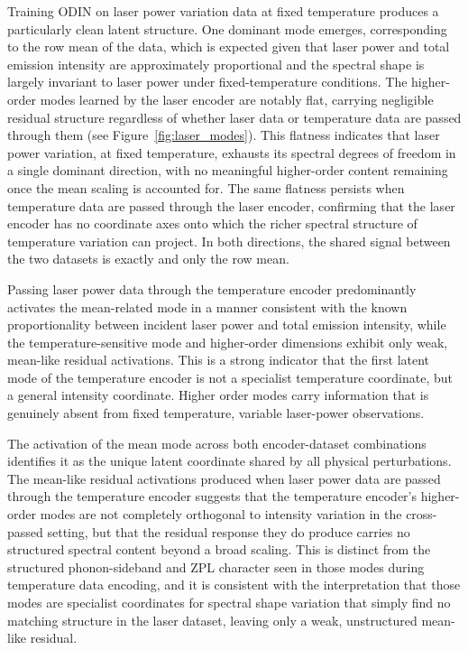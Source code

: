 \documentclass[twoside,11pt]{article}
\begin{document}
Training ODIN on laser power variation data at fixed temperature produces a particularly clean latent structure. One dominant mode emerges, corresponding to the row mean of the data, which is expected given that laser power and total emission intensity are approximately proportional and the spectral shape is largely invariant to laser power under fixed-temperature conditions. The higher-order modes learned by the laser encoder are notably flat, carrying negligible residual structure regardless of whether laser data or temperature data are passed through them (see Figure~\ref{fig:laser_modes}). This flatness indicates that laser power variation, at fixed temperature, exhausts its spectral degrees of freedom in a single dominant direction, with no meaningful higher-order content remaining once the mean scaling is accounted for. The same flatness persists when temperature data are passed through the laser encoder, confirming that the laser encoder has no coordinate axes onto which the richer spectral structure of temperature variation can project. In both directions, the shared signal between the two datasets is exactly and only the row mean. 

Passing laser power data through the temperature encoder predominantly activates the mean-related mode in a manner consistent with the known proportionality between incident laser power and total emission intensity, while the temperature-sensitive mode and higher-order dimensions exhibit only weak, mean-like residual activations. This is a strong indicator that the first latent mode of the temperature encoder is not a specialist temperature coordinate, but a general intensity coordinate. Higher order modes carry information that is genuinely absent from fixed temperature, variable laser-power observations.

The activation of the mean mode across both encoder-dataset combinations identifies it as the unique latent coordinate shared by all physical perturbations. The mean-like residual activations produced when laser power data are passed through the temperature encoder suggests that the temperature encoder's higher-order modes are not completely orthogonal to intensity variation in the cross-passed setting, but that the residual response they do produce carries no structured spectral content beyond a broad scaling. This is distinct from the structured phonon-sideband and ZPL character seen in those modes during temperature data encoding, and it is consistent with the interpretation that those modes are specialist coordinates for spectral shape variation that simply find no matching structure in the laser dataset, leaving only a weak, unstructured mean-like residual.
\end{document}
